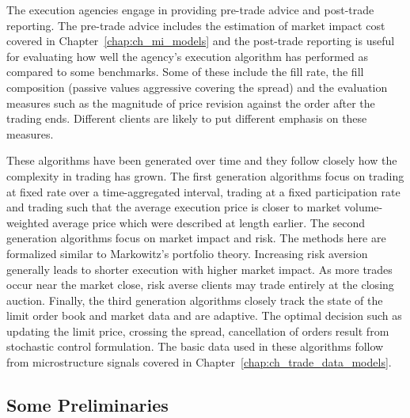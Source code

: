The execution agencies engage in providing pre-trade advice and post-trade reporting. The pre-trade advice includes the estimation of market impact cost covered in Chapter~\ref{chap:ch_mi_models} and the post-trade reporting is useful for evaluating how well the agency's execution algorithm has performed as compared to some benchmarks. Some of these include the fill rate, the fill composition (passive values aggressive covering the spread) and the evaluation measures such as the magnitude of price revision against the order after the trading ends. Different clients are likely to put different emphasis on these measures. 


These algorithms have been generated over time and they follow closely how the complexity in trading has grown. The first generation algorithms focus on trading at fixed rate over a time-aggregated interval, trading at a fixed participation rate and trading such that the average execution price is closer to market volume-weighted average price which were described at length earlier. The second generation algorithms focus on market impact and risk. The methods here are formalized similar to Markowitz's portfolio theory. Increasing risk aversion generally leads to shorter execution with higher market impact. As more trades occur near the market close, risk averse clients may trade entirely at the closing auction. Finally, the third generation algorithms closely track the state of the limit order book and market data and are adaptive. The optimal decision such as updating the limit price, crossing the spread, cancellation of orders result from stochastic control formulation. The basic data used in these algorithms follow from microstructure signals covered in Chapter~\ref{chap:ch_trade_data_models}. 


\subsection{Some Preliminaries}

